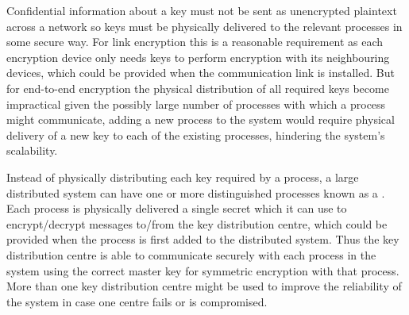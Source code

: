 Confidential information about a key must not be sent as unencrypted plaintext
across a network so keys must be physically delivered to the relevant processes
in some secure way. For link encryption this is a reasonable requirement as each
encryption device only needs keys to perform encryption with its neighbouring
devices, which could be provided when the communication link is installed.
But for end-to-end encryption the physical distribution of all required keys
become impractical given the possibly large number of processes with which a
process might communicate, adding a new process to the system would require
physical delivery of a new key to each of the existing processes,
hindering the system's scalability.

Instead of physically distributing each key required by a process,
a large distributed system can have one or more distinguished processes known as
a . Each process is physically delivered a single
secret  which it can use to encrypt/decrypt messages to/from the
key distribution centre, which could be provided when the process is
first added to the distributed system. Thus the key distribution centre is
able to communicate securely with each process in the system
using the correct master key for symmetric encryption with that process.
More than one key distribution centre might be used to improve the reliability
of the system in case one centre fails or is compromised.

